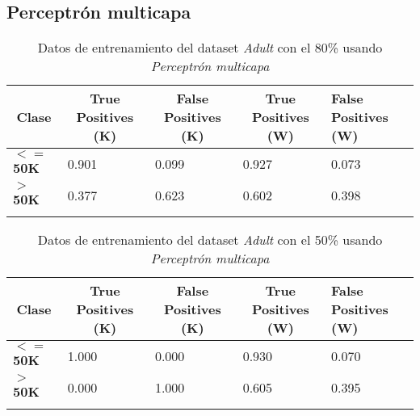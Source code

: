 \documentclass[10pt,a4paper]{article}
\begin{document}
\subsection{Perceptrón multicapa}
\begin{table}[h]
\begin{tabular}{lllll}
\hline
\multicolumn{1}{|c|}{\textbf{Clase}} & \multicolumn{1}{c|}{\textbf{True Positives (K)}} & \multicolumn{1}{c|}{\textbf{False Positives (K)}} & \multicolumn{1}{c|}{\textbf{True Positives (W)}} & \multicolumn{1}{l|}{\textbf{False Positives (W)}} \\ \hline
\multicolumn{1}{|l|}{\textbf{$<=$50K}} & \multicolumn{1}{l|}{0.901}          & \multicolumn{1}{l|}{0.099}          & \multicolumn{1}{l|}{0.927}          & \multicolumn{1}{l|}{0.073} \\ \hline
\multicolumn{1}{|l|}{\textbf{$>$50K}} & \multicolumn{1}{l|}{0.377}          & \multicolumn{1}{l|}{0.623}          & \multicolumn{1}{l|}{0.602}          & \multicolumn{1}{l|}{0.398} \\ \hline
\textbf{}                       &                                &                                &                                &                      
\end{tabular}
\caption{Datos de entrenamiento del dataset \emph{Adult} con el 80\% usando \emph{Perceptrón multicapa}}
\label{tab:adult_perceptron_80}
\end{table}

\begin{table}[h]
\begin{tabular}{lllll}
\hline
\multicolumn{1}{|c|}{\textbf{Clase}} & \multicolumn{1}{c|}{\textbf{True Positives (K)}} & \multicolumn{1}{c|}{\textbf{False Positives (K)}} & \multicolumn{1}{c|}{\textbf{True Positives (W)}} & \multicolumn{1}{l|}{\textbf{False Positives (W)}} \\ \hline
\multicolumn{1}{|l|}{\textbf{$<=$50K}} & \multicolumn{1}{l|}{1.000}          & \multicolumn{1}{l|}{0.000}          & \multicolumn{1}{l|}{0.930}          & \multicolumn{1}{l|}{0.070} \\ \hline
\multicolumn{1}{|l|}{\textbf{$>$50K}} & \multicolumn{1}{l|}{0.000}          & \multicolumn{1}{l|}{1.000}          & \multicolumn{1}{l|}{0.605}          & \multicolumn{1}{l|}{0.395} \\ \hline
\textbf{}                       &                                &                                &                                &                      
\end{tabular}
\caption{Datos de entrenamiento del dataset \emph{Adult} con el 50\% usando \emph{Perceptrón multicapa}}
\label{tab:adult_perceptron_50}
\end{table}
\end{document}

